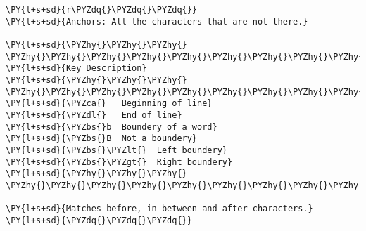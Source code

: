 

\section*{}

\begin{Verbatim}[commandchars=\\\{\}]
\PY{l+s+sd}{r\PYZdq{}\PYZdq{}\PYZdq{}}
\PY{l+s+sd}{Anchors: All the characters that are not there.}

\PY{l+s+sd}{\PYZhy{}\PYZhy{}\PYZhy{} \PYZhy{}\PYZhy{}\PYZhy{}\PYZhy{}\PYZhy{}\PYZhy{}\PYZhy{}\PYZhy{}\PYZhy{}\PYZhy{}\PYZhy{}\PYZhy{}\PYZhy{}\PYZhy{}\PYZhy{}\PYZhy{}\PYZhy{}\PYZhy{}}
\PY{l+s+sd}{Key Description}
\PY{l+s+sd}{\PYZhy{}\PYZhy{}\PYZhy{} \PYZhy{}\PYZhy{}\PYZhy{}\PYZhy{}\PYZhy{}\PYZhy{}\PYZhy{}\PYZhy{}\PYZhy{}\PYZhy{}\PYZhy{}\PYZhy{}\PYZhy{}\PYZhy{}\PYZhy{}\PYZhy{}\PYZhy{}\PYZhy{}}
\PY{l+s+sd}{\PYZca{}   Beginning of line}
\PY{l+s+sd}{\PYZdl{}   End of line}
\PY{l+s+sd}{\PYZbs{}b  Boundery of a word}
\PY{l+s+sd}{\PYZbs{}B  Not a boundery}
\PY{l+s+sd}{\PYZbs{}\PYZlt{}  Left boundery}
\PY{l+s+sd}{\PYZbs{}\PYZgt{}  Right boundery}
\PY{l+s+sd}{\PYZhy{}\PYZhy{}\PYZhy{} \PYZhy{}\PYZhy{}\PYZhy{}\PYZhy{}\PYZhy{}\PYZhy{}\PYZhy{}\PYZhy{}\PYZhy{}\PYZhy{}\PYZhy{}\PYZhy{}\PYZhy{}\PYZhy{}\PYZhy{}\PYZhy{}\PYZhy{}\PYZhy{}}

\PY{l+s+sd}{Matches before, in between and after characters.}
\PY{l+s+sd}{\PYZdq{}\PYZdq{}\PYZdq{}}
\end{Verbatim}

